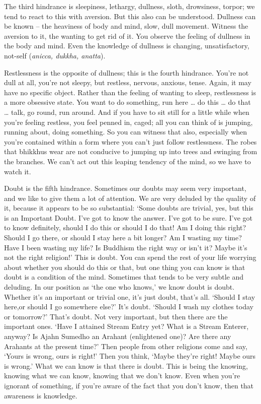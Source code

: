 The third hindrance is sleepiness, lethargy, dullness, sloth, drowsiness, torpor; we tend to react to this with aversion. But this also can be understood. Dullness can be known -- the heaviness of body and mind, slow, dull movement. Witness the aversion to it, the wanting to get rid of it. You observe the feeling of dullness in the body and mind. Even the knowledge of dullness is changing, unsatisfactory, not-self (\textit{anicca, dukkha, anatta}).

Restlessness is the opposite of dullness; this is the fourth hindrance. You're not dull at all, you're not sleepy, but restless, nervous, anxious, tense. Again, it may have no specific object. Rather than the feeling of wanting to sleep, restlessness is a more obsessive state. You want to do something, run here \ldots{} do this \ldots{} do that \ldots{} talk, go round, run around. And if you have to sit still for a little while when you're feeling restless, you feel penned in, caged; all you can think of is jumping, running about, doing something. So you can witness that also, especially when you're contained within a form where you can't just follow restlessness. The robes that bhikkhus wear are not conducive to jumping up into trees and swinging from the branches. We can't act out this leaping tendency of the mind, so we have to watch it.

Doubt is the fifth hindrance. Sometimes our doubts may seem very important, and we like to give them a lot of attention. We are very deluded by the quality of it, because it appears to be so substantial: `Some doubts are trivial, yes, but this is an Important Doubt. I've got to know the answer. I've got to be sure. I've got to know definitely, should I do this or should I do that! Am I doing this right? Should I go there, or should I stay here a bit longer? Am I wasting my time? Have I been wasting my life? Is Buddhism the right way or isn't it? Maybe it's not the right religion!' This is doubt. You can spend the rest of your life worrying about whether you should do this or that, but one thing you can know is that doubt is a condition of the mind. Sometimes that tends to be very subtle and deluding. In our position as `the one who knows,' we know doubt is doubt. Whether it's an important or trivial one, it's just doubt, that's all. `Should I stay here,or should I go somewhere else?' It's doubt. `Should I wash my clothes today or tomorrow?' That's doubt. Not very important, but then there are the important ones. `Have I attained Stream Entry yet? What is a Stream Enterer, anyway? Is Ajahn Sumedho an Arahant (enlightened one)? Are there any Arahants at the present time?' Then people from other religions come and say, `Yours is wrong, ours is right!' Then you think, `Maybe they're right! Maybe ours is wrong.' What we can know is that there is doubt. This is being the knowing, knowing what we can know, knowing that we don't know. Even when you're ignorant of something, if you're aware of the fact that you don't know, then that awareness is knowledge.

